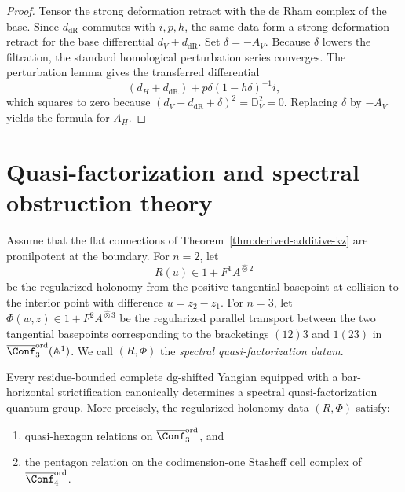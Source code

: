 \begin{proof}
Tensor the strong deformation retract with the de Rham complex of the
base. Since $d_{\mathrm{dR}}$ commutes with $i,p,h$, the same data form a
strong deformation retract for the base differential
$d_V+d_{\mathrm{dR}}$. Set $\delta=-A_V$. Because $\delta$ lowers the
filtration, the standard homological perturbation series converges.
The perturbation lemma gives the transferred differential
\[
(d_H+d_{\mathrm{dR}})+p\delta(1-h\delta)^{-1}i,
\]
which squares to zero because
$(d_V+d_{\mathrm{dR}}+\delta)^2=\mathbb D_V^2=0$.
Replacing $\delta$ by $-A_V$ yields the formula for $A_H$.
\end{proof}

\section{Quasi-factorization and spectral obstruction theory}

\begin{definition}
Assume that the flat connections of
Theorem~\ref{thm:derived-additive-kz} are pronilpotent at the boundary.
For $n=2$, let
\[
R(u)\in 1+F^1A^{\widehat\otimes 2}
\]
be the regularized holonomy from the positive tangential basepoint at
collision to the interior point with difference $u=z_2-z_1$.
For $n=3$, let $\Phi(w,z)\in 1+F^2A^{\widehat\otimes 3}$ be the
regularized parallel transport between the two tangential basepoints
corresponding to the bracketings $(12)3$ and $1(23)$ in
$\overline{\Conf}_3^{\mathrm{ord}}(\mathbb A^1)$.
We call $(R,\Phi)$ the \emph{spectral quasi-factorization datum}.
\end{definition}

\begin{theorem}
\ClaimStatusProvedHere
\label{thm:quasi-factorization}
Every residue-bounded complete dg-shifted Yangian equipped with a
bar-horizontal strictification canonically determines a spectral
quasi-factorization quantum group.
More precisely, the regularized holonomy data $(R,\Phi)$ satisfy:
\begin{enumerate}
\item quasi-hexagon relations on $\overline{\Conf}_3^{\mathrm{ord}}$, and
\item the pentagon relation on the codimension-one Stasheff cell complex
 of $\overline{\Conf}_4^{\mathrm{ord}}$.
\end{enumerate}
\end{theorem}

